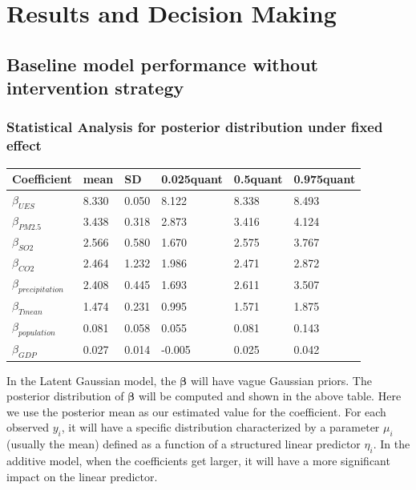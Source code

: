 \documentclass{mcmthesis}
\begin{document}
\section{Results and Decision Making}
\subsection{Baseline model performance without intervention strategy}
\subsubsection{Statistical Analysis for posterior distribution under fixed effect} 


\begin{center}
\begin{tabular}{llllll}
\hline
Coefficient & mean & SD & 0.025quant & 0.5quant & 0.975quant\\
\hline
$\beta_{UES}$& 8.330 & 0.050 & 8.122 & 8.338 & 8.493         \\
$\beta_{PM2.5}$& 3.438 & 0.318 & 2.873 & 3.416 & 4.124      \\
$\beta_{SO2}$& 2.566& 0.580 & 1.670 & 2.575 & 3.767            \\
$\beta_{CO2}$& 2.464 & 1.232 & 1.986 & 2.471 & 2.872            \\
$\beta_{precipitation}$& 2.408 & 0.445 & 1.693 & 2.611 & 3.507          \\
$\beta_{Tmean}$& 1.474 & 0.231 & 0.995 & 1.571 & 1.875              \\
$\beta_{population}$& 0.081 & 0.058 &  0.055 & 0.081 & 0.143                \\
$\beta_{GDP}$& 0.027 & 0.014 & -0.005 & 0.025 & 0.042                    \\
\hline 
                                
\end{tabular}
\end{center}

In the Latent Gaussian model, the $\boldsymbol{\beta}$ will have vague Gaussian priors. The posterior distribution of $\boldsymbol{\beta}$ will be computed and shown in the above table. Here we use the posterior mean as our estimated value for the coefficient. For each observed $y_{i}$, it will have a specific distribution characterized by a parameter  $\mu_{i}$  (usually the mean) defined as a function of a structured linear predictor  $\eta_{i}$. In the additive model, when the coefficients get larger, it will have a more significant impact on the linear predictor.
\end{document}
